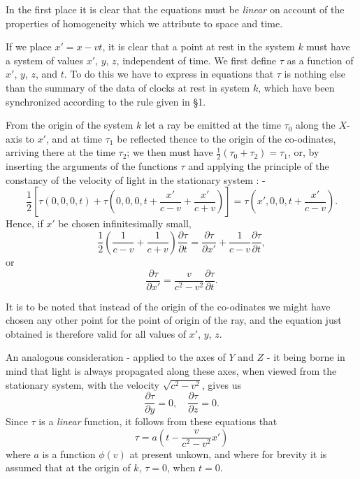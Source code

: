 In the first place it is clear that the equations must be \textit{linear} on account of the properties of homogeneity which we attribute to space and time.

If we place $x' = x - vt$, it is clear that a point at rest in the system $k$ must have a system of values $x'$, $y$, $z$, independent of time. We first define $\tau$ as a function of $x'$, $y$, $z$, and $t$. To do this we have to express in equations that $\tau$ is nothing else than the summary of the data of clocks at rest in system $k$, which have been synchronized according to the rule given in \S 1.

From the origin of the system $k$ let a ray be emitted at the time $\tau_0$ along the $X$-axis to $x'$, and at time $\tau_1$ be reflected thence to the origin of the co-odinates, arriving there at the time $\tau_2$; we then must have $\frac{1}{2}(\tau_0 + \tau_2) = \tau_1$, or, by inserting the arguments of the functions $\tau$ and applying the principle of the constancy of the velocity of light in the stationary system : - $$ \frac{1}{2}\left[ \tau(0,0,0,t) + \tau\left(0,0,0,t+\frac{x'}{c-v}+\frac{x'}{c+v}\right) \right] = \tau\left( x',0,0, t+\frac{x'}{c-v} \right) .$$ Hence, if $x'$ be chosen infinitesimally small, $$ \frac{1}{2}\left( \frac{1}{c-v} + \frac{1}{c+v} \right) \frac{\partial\tau}{\partial t} = \frac{\partial \tau}{\partial x'} + \frac{1}{c-v}\frac{\partial\tau}{\partial t} ,$$ or $$ \frac{\partial\tau}{\partial x'} = \frac{v}{c^2 - v^2} \frac{\partial\tau}{\partial t} .$$

It is to be noted that instead of the origin of the co-odinates we might have chosen any other point for the point of origin of the ray, and the equation just obtained is therefore valid for all values of $x'$, $y$, $z$.

An analogous consideration - applied to the axes of $Y$ and $Z$ - it being borne in mind that light is always propagated along these axes, when viewed from the stationary system, with the velocity $\sqrt{c^2 - v^2}$, gives us $$ \frac{\partial\tau}{\partial y} = 0,\quad \frac{\partial\tau}{\partial z} = 0 .$$ Since $\tau$ is a \textit{linear} function, it follows from these equations that $$ \tau = a\left( t - \frac{v}{c^2 - v^2} x' \right) $$ where $a$ is a function $\phi(v)$ at present unkown, and where for brevity it is assumed that at the origin of $k$, $\tau = 0$, when $t = 0$.

